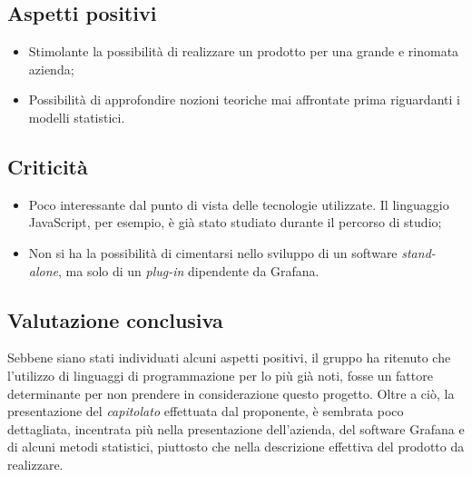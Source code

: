 \subsection{Aspetti positivi}
\begin{itemize}
	\item Stimolante la possibilità di realizzare un prodotto per una grande e rinomata azienda;
	\item Possibilità di approfondire nozioni teoriche mai affrontate prima riguardanti i modelli statistici.
\end{itemize}

\subsection{Criticità}
\begin{itemize}
	\item Poco interessante dal punto di vista delle tecnologie utilizzate. Il linguaggio JavaScript, per esempio, è già stato studiato durante il percorso di studio;
	\item Non si ha la possibilità di cimentarsi nello sviluppo di un software \textit{stand-alone\glos}, ma solo di un \textit{plug-in\glo} dipendente da Grafana. 
\end{itemize}

\subsection{Valutazione conclusiva}
Sebbene siano stati individuati alcuni aspetti positivi, il gruppo ha ritenuto che l'utilizzo di linguaggi di programmazione per lo più già noti, fosse un fattore determinante per non prendere in considerazione questo progetto. Oltre a ciò, la presentazione del \textit{capitolato\glo} effettuata dal proponente, è sembrata poco dettagliata, incentrata più nella presentazione dell'azienda, del software Grafana e di alcuni metodi statistici, piuttosto che nella descrizione effettiva del prodotto da realizzare.